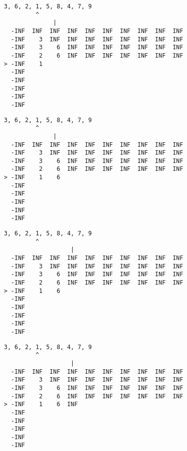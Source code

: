 { \begin{verbatim}
3, 6, 2, 1, 5, 8, 4, 7, 9
         ^
              |
  -INF  INF  INF  INF  INF  INF  INF  INF  INF  INF
  -INF    3  INF  INF  INF  INF  INF  INF  INF  INF
  -INF    3    6  INF  INF  INF  INF  INF  INF  INF
  -INF    2    6  INF  INF  INF  INF  INF  INF  INF
> -INF    1                                        
  -INF                                             
  -INF                                             
  -INF                                             
  -INF                                             
  -INF                                             
\end{verbatim} }

{ \begin{verbatim}
3, 6, 2, 1, 5, 8, 4, 7, 9
         ^
              |
  -INF  INF  INF  INF  INF  INF  INF  INF  INF  INF
  -INF    3  INF  INF  INF  INF  INF  INF  INF  INF
  -INF    3    6  INF  INF  INF  INF  INF  INF  INF
  -INF    2    6  INF  INF  INF  INF  INF  INF  INF
> -INF    1    6                                   
  -INF                                             
  -INF                                             
  -INF                                             
  -INF                                             
  -INF                                             
\end{verbatim} }

{ \begin{verbatim}
3, 6, 2, 1, 5, 8, 4, 7, 9
         ^
                   |
  -INF  INF  INF  INF  INF  INF  INF  INF  INF  INF
  -INF    3  INF  INF  INF  INF  INF  INF  INF  INF
  -INF    3    6  INF  INF  INF  INF  INF  INF  INF
  -INF    2    6  INF  INF  INF  INF  INF  INF  INF
> -INF    1    6                                   
  -INF                                             
  -INF                                             
  -INF                                             
  -INF                                             
  -INF                                             
\end{verbatim} }

{ \begin{verbatim}
3, 6, 2, 1, 5, 8, 4, 7, 9
         ^
                   |
  -INF  INF  INF  INF  INF  INF  INF  INF  INF  INF
  -INF    3  INF  INF  INF  INF  INF  INF  INF  INF
  -INF    3    6  INF  INF  INF  INF  INF  INF  INF
  -INF    2    6  INF  INF  INF  INF  INF  INF  INF
> -INF    1    6  INF                              
  -INF                                             
  -INF                                             
  -INF                                             
  -INF                                             
  -INF                                             
\end{verbatim} }

